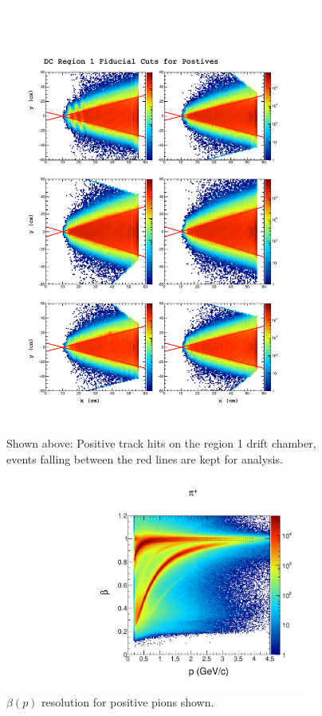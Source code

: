 \begin{figure}
 \label{fig:fid}
  \begin{center}
    \includegraphics[width=10cm]{image/fid.pdf}
    \caption{Shown above: Positive track hits on the region 1 drift chamber, events falling between the red lines are kept for analysis.}
  \end{center}
\end{figure}

\begin{figure}
  \label{fig:pbeta}
  \begin{center}
    \includegraphics[width=10cm]{image/beautiful_pbeta_pip.pdf}
    \caption{$\beta(p)$ resolution for positive pions shown.}
  \end{center}
\end{figure}

